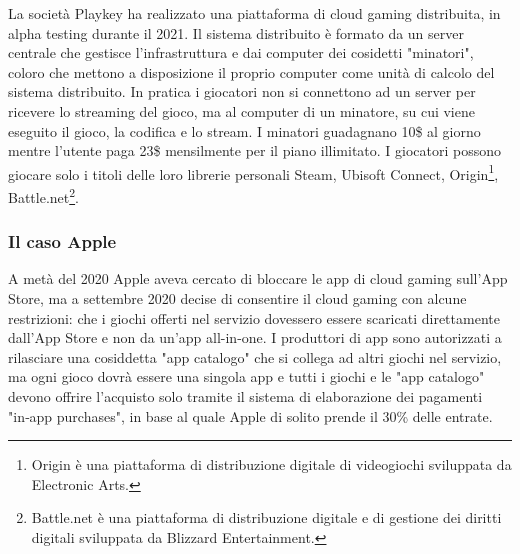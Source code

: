 La società Playkey ha realizzato una piattaforma di cloud gaming distribuita, in alpha testing durante il 2021. Il sistema distribuito è formato da un server centrale che gestisce l'infrastruttura e dai computer dei cosidetti "minatori", coloro che mettono a disposizione il proprio computer come unità di calcolo del sistema distribuito. In pratica i giocatori non si connettono ad un server per ricevere lo streaming del gioco, ma al computer di un minatore, su cui viene eseguito il gioco, la codifica e lo stream. I minatori guadagnano 10\$ al giorno mentre l'utente paga 23\$ mensilmente per il piano illimitato. I giocatori possono giocare solo i titoli delle loro librerie personali Steam, Ubisoft Connect, Origin\footnote{Origin è una piattaforma di distribuzione digitale di videogiochi sviluppata da Electronic Arts.}, Battle.net\footnote{Battle.net è una piattaforma di distribuzione digitale e di gestione dei diritti digitali sviluppata da Blizzard Entertainment.}\cite{Playkey}.


\subsubsection{Il caso Apple}
A metà del 2020 Apple aveva cercato di bloccare le app di cloud gaming sull'App Store, ma a settembre 2020 decise di consentire il cloud gaming con alcune restrizioni: che i giochi offerti nel servizio dovessero essere scaricati direttamente dall'App Store e non da un'app all-in-one. I produttori di app sono autorizzati a rilasciare una cosiddetta "app catalogo" che si collega ad altri giochi nel servizio, ma ogni gioco dovrà essere una singola app e tutti i giochi e le "app catalogo" devono offrire l'acquisto solo tramite il sistema di elaborazione dei pagamenti "in‑app purchases", in base al quale Apple di solito prende il 30\% delle entrate\cite{Apple_controversy}.